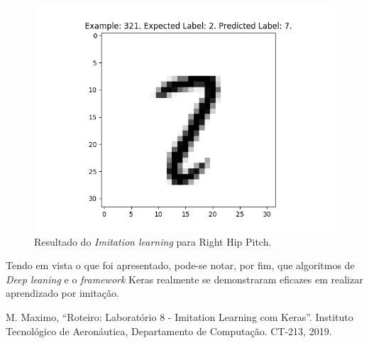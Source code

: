 \documentclass[conference]{IEEEtran}
\begin{document}
\begin{figure}[htbp]
\centering
\centerline{\includegraphics[scale=0.5]{imagens/misclassified_image_321.png}}
\caption{Resultado do \textit{Imitation learning} para Right Hip Pitch.}
\label{misclassified_image_321}
\end{figure}

Tendo em vista o que foi apresentado, pode-se notar, por fim, que algoritmos de \textit{Deep leaning} e o \textit{framework} Keras realmente se demonstraram eficazes em realizar aprendizado por imitação.

\begin{thebibliography}{00}
 M. Maximo, ``Roteiro: Laboratório 8 - Imitation Learning com Keras''. Instituto Tecnológico de Aeronáutica, Departamento de Computação. CT-213, 2019.
\end{thebibliography}
\end{document}
